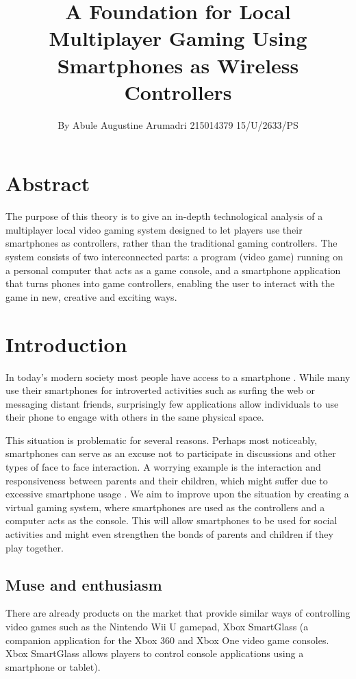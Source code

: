 \documentclass{article}
\title{A Foundation for Local Multiplayer Gaming Using Smartphones as Wireless Controllers}
\author{By Abule Augustine Arumadri 215014379 15/U/2633/PS}
\date{}
\begin{document}
\maketitle
\section{Abstract}
The purpose of this theory is to give an in-depth technological analysis of a multiplayer local video gaming system designed to let players use their smartphones as controllers, rather than the traditional gaming controllers. The system consists of two interconnected parts: a program (video game) running on a personal computer that acts as a game console, and a smartphone application that turns phones into game controllers, enabling the user to interact with the game in new, creative and exciting ways.


\section{Introduction}
In today's modern society most people have access to a smartphone \cite{key:1}. While many use their
smartphones for introverted activities such as surfing the web or messaging distant friends,
surprisingly few applications allow individuals to use their phone to engage with others in the
same physical space.

This situation is problematic for several reasons. Perhaps most noticeably, smartphones can serve
as an excuse not to participate in discussions and other types of face to face interaction. A
worrying example is the interaction and responsiveness between parents and their children,
which might suffer due to excessive smartphone usage \cite{key:2}. We aim to improve upon the situation
by creating a virtual gaming system, where smartphones are used as the controllers and a
computer acts as the console. This will allow smartphones to be used for social activities and
might even strengthen the bonds of parents and children if they play together.


\subsection{Muse and enthusiasm}
There are already products on the market that provide similar ways of controlling video games such as the Nintendo Wii U gamepad, Xbox SmartGlass (a companion application for the Xbox
360 and Xbox One video game consoles. Xbox SmartGlass allows players to control console
applications using a smartphone or tablet).
\end{document}
